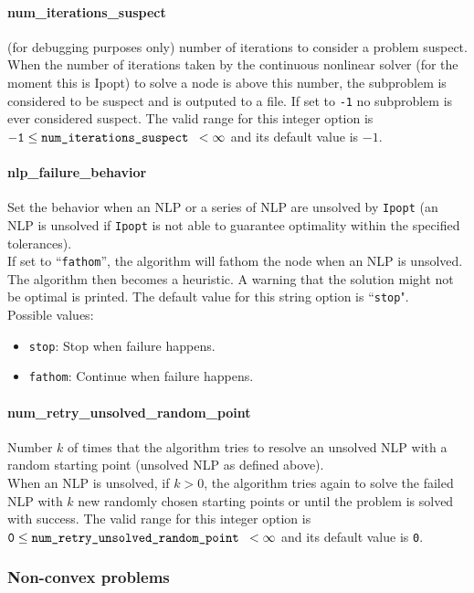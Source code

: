 \paragraph{num\_iterations\_suspect}
(for debugging purposes only) number of iterations to consider a problem
suspect. \\
When the number of iterations taken by the continuous nonlinear solver
(for the moment this is Ipopt) to solve a node is above this number,
the subproblem is considered to be suspect and is outputed
to a file. If set to {\tt -1} no subproblem is ever considered suspect.
The valid range for this integer option is
${\tt -1} \le \hbox{\tt num\_iterations\_suspect } <  \infty$
and its default value is $-1$.

\paragraph{nlp\_failure\_behavior}
Set the behavior when an NLP or a series of NLP are unsolved by {\tt Ipopt}
(an NLP is unsolved if {\tt Ipopt} is not able to guarantee optimality within the specified tolerances).\\
If set to ``{\tt fathom}'', the algorithm will fathom the node when an NLP is unsolved. The algorithm then becomes a heuristic. A warning that the solution might not be optimal is printed.
The default value for this string option is ``{\tt stop}". \\
Possible values:
\begin{itemize}
   \item {\tt stop}: Stop when failure happens.
   \item {\tt fathom}: Continue when failure happens.
\end{itemize}

\paragraph{num\_retry\_unsolved\_random\_point}
Number $k$ of times that the algorithm tries to resolve an unsolved NLP with a random starting point (unsolved NLP as defined above). \\
 When an NLP is unsolved, if $k > 0$, the algorithm tries
again to solve the failed NLP with $k$ new
randomly chosen starting points  or until the
problem is solved with success. The valid range for this integer option is
${\tt 0} \le \hbox{\tt num\_retry\_unsolved\_random\_point } <  \infty$
and its default value is {\tt 0}.

\subsubsection{Non-convex problems}

